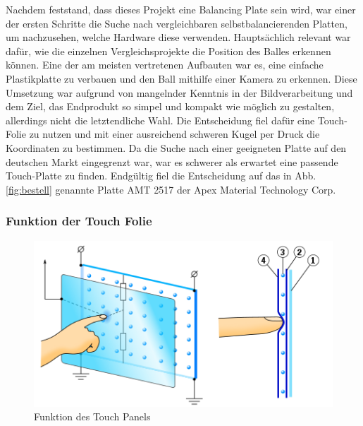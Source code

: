\documentclass[12pt,a4paper,bibliography=totoc,listof=totoc]{scrartcl}
\begin{document}
Nachdem feststand, dass dieses Projekt eine Balancing Plate sein wird, war einer der ersten Schritte die Suche nach vergleichbaren selbstbalancierenden Platten, um nachzusehen, welche Hardware diese verwenden. Hauptsächlich relevant war dafür, wie die einzelnen Vergleichsprojekte die Position des Balles erkennen können. Eine der am meisten vertretenen Aufbauten war es, eine einfache Plastikplatte zu verbauen und den Ball mithilfe einer Kamera zu erkennen. Diese Umsetzung war aufgrund von mangelnder Kenntnis in der Bildverarbeitung und dem Ziel, das Endprodukt so simpel und kompakt wie möglich zu gestalten, allerdings nicht die letztendliche Wahl. Die Entscheidung fiel dafür eine Touch-Folie zu nutzen und mit einer ausreichend schweren Kugel per Druck die Koordinaten zu bestimmen. Da die Suche nach einer geeigneten Platte auf den deutschen Markt eingegrenzt war, war es schwerer als erwartet eine passende Touch-Platte zu finden. Endgültig fiel die Entscheidung auf das in Abb. \ref{fig:bestell} genannte Platte AMT 2517 der Apex Material Technology Corp.

\subsubsection{Funktion der Touch Folie}

\begin{figure}[htbp]
	\centering
	\includegraphics[scale = 0.6]{pics/TouchScreen_5wires.png}
	\caption{Funktion des Touch Panels \cite {wikipdeia}} 
	\label{fig:TouchPanelFunction}
\end{figure}
\end{document}
